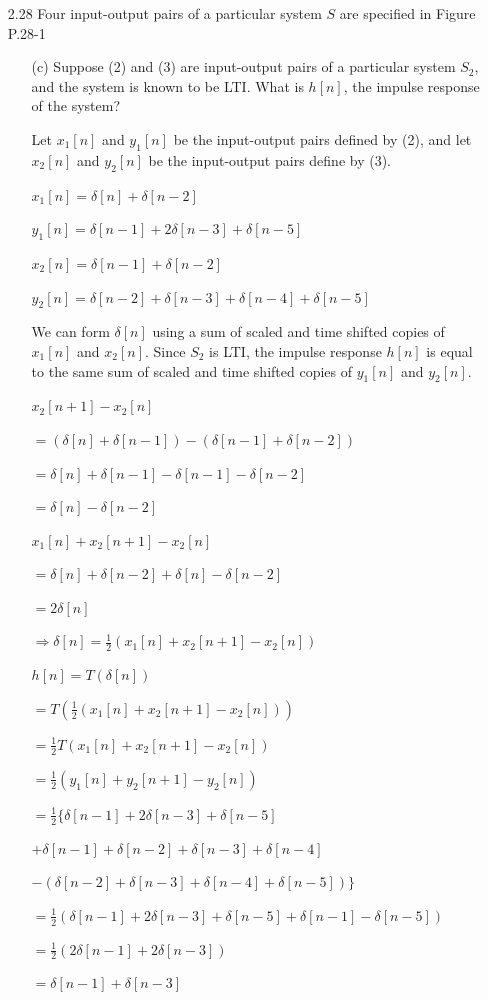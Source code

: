 \documentclass[fleqn]{article}
\begin{document}
\begin{enumerate}[nolistsep]
\begin{enumerate}[nolistsep]
		\end{enumerate}
		
		\item[2.28] Four input-output pairs of a particular system $S$ are specified in Figure P.28-1
		
			\begin{enumerate}
				\item[(c)] Suppose (2) and (3) are input-output pairs of a particular system $S_2$, and the system is known to be LTI. What is $h[n]$, the impulse response of the system?
				
				Let $x_1[n]$ and $y_1[n]$ be the input-output pairs defined by (2), and let $x_2[n]$ and $y_2[n]$ be the input-output pairs define by (3).
				
			$x_1[n] = \delta[n] + \delta[n-2]$
			
			$y_1[n] = \delta[n-1] + 2\delta[n-3] + \delta[n-5]$
			
			$x_2[n] = \delta[n-1] + \delta[n-2]$
			
			$y_2[n] = \delta[n-2] + \delta[n-3] + \delta[n-4] + \delta[n-5]$
			
			We can form $\delta[n]$ using a sum of scaled and time shifted copies of $x_1[n]$ and $x_2[n]$. Since $S_2$ is LTI, the impulse response $h[n]$ is equal to the same sum of scaled and time shifted copies of $y_1[n]$ and $y_2[n]$.
			
			$x_2[n+1] - x_2[n]$
			
			$ = (\delta[n] + \delta[n-1]) - (\delta[n-1] + \delta[n-2])$
			
			$ = \delta[n] + \delta[n-1] - \delta[n-1] - \delta[n-2]$
			
			$ = \delta[n] - \delta[n-2]$
			
			$x_1[n] + x_2[n+1] - x_2[n]$
			
			$ = \delta[n] + \delta[n-2] + \delta[n] - \delta[n-2]$
			
			$ = 2\delta[n]$
			
			$\Rightarrow \delta[n] = \frac{1}{2}(x_1[n] + x_2[n+1] - x_2[n])$
			
			$h[n] = T(\delta[n])$
			
			$ = T(\frac{1}{2}(x_1[n] + x_2[n+1] - x_2[n]))$
			
			$ = \frac{1}{2}T(x_1[n] + x_2[n+1] - x_2[n])$
			
			$ = \frac{1}{2}(y_1[n] + y_2[n+1] - y_2[n])$
			
			$ = \frac{1}{2}\{\delta[n-1] + 2\delta[n-3] + \delta[n-5]$
			
			$ + \delta[n-1] + \delta[n-2] + \delta[n-3] + \delta[n-4]$
			
			$ - (\delta[n-2] + \delta[n-3] + \delta[n-4] + \delta[n-5])\}$
			
			$ = \frac{1}{2}(\delta[n-1] + 2\delta[n-3] + \delta[n-5] + \delta[n-1] - \delta[n-5])$
			
			$ = \frac{1}{2}(2\delta[n-1] + 2\delta[n-3])$
			
			$ = \delta[n-1] + \delta[n-3]$
			\end{enumerate}
		
	\end{enumerate}
\end{document}
